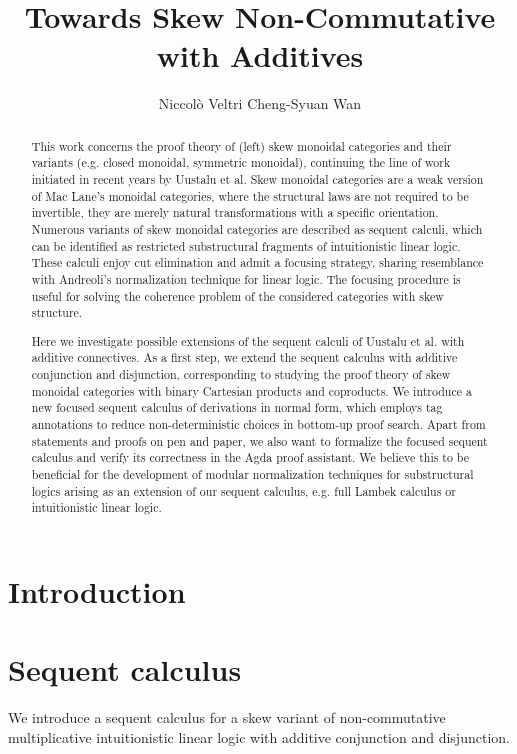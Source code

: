 \documentclass[submission,copyright,creativecommons]{eptcs}
\title{Towards Skew Non-Commutative \MILL \text{ }with Additives}
\author{
Niccol{\`o} Veltri \qquad\qquad Cheng-Syuan Wan
\institute{Tallinn University of Technology, Estonia}
\email{\quad niccolo@cs.ioc.ee \quad\qquad cswan@cs.ioc.ee}
}
\theoremstyle{definition}
\begin{document}
\maketitle
\begin{abstract}
This work concerns the proof theory of (left) skew monoidal categories and their variants (e.g. closed monoidal, symmetric monoidal), continuing the line of work initiated in recent years by Uustalu et al.
Skew monoidal categories are a weak version of Mac Lane's monoidal categories, where the structural laws are not required to be invertible, they are merely natural transformations with a specific orientation. 
Numerous variants of skew monoidal categories are described as sequent calculi, which can be identified as restricted substructural fragments of intuitionistic linear logic. These calculi enjoy cut elimination and admit a focusing strategy, sharing resemblance with Andreoli's normalization technique for linear logic. The focusing procedure is useful for solving the coherence problem of the considered categories with skew structure.

Here we investigate possible extensions of the sequent calculi of Uustalu et al. with additive connectives. 
As a first step, we extend the sequent calculus with additive conjunction and disjunction, corresponding to studying the proof theory of skew monoidal categories with binary Cartesian products and coproducts. 
We introduce a new focused sequent calculus of derivations in normal form, which employs tag annotations to reduce non-deterministic choices in bottom-up proof search.
Apart from statements and proofs on pen and paper, we also want to formalize the focused sequent calculus and verify its correctness in the Agda proof assistant.
We believe this to be beneficial for the development of modular normalization techniques for substructural logics arising as an extension of our sequent calculus, e.g. full Lambek calculus or intuitionistic linear logic.
\end{abstract}

\section{Introduction}

\section{Sequent calculus}
We introduce a sequent calculus for a skew variant of non-commutative multiplicative intuitionistic linear logic with additive conjunction and disjunction.
\end{document}

